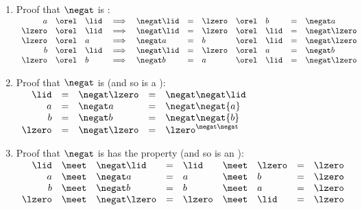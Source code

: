 \begin{proofns}
\begin{enumerate}
  \item Proof that $\negat$ is :
    $\begin{array}[t]{rcl c lcl c lclc}
      a      &\orel& \lid &\implies& \negat\lid &=& \lzero &\orel& b    &=&  \negat a     \\
      \lzero &\orel& \lid &\implies& \negat\lid &=& \lzero &\orel& \lid &=& \negat\lzero \\
      \lzero &\orel& a    &\implies&  \negat a   &=& b      &\orel& \lid &=& \negat\lzero \\
      b      &\orel& \lid &\implies& \negat\lid &=& \lzero &\orel& a    &=&  \negat b     \\
      \lzero &\orel& b    &\implies&  \negat b   &=& a      &\orel& \lid &=& \negat\lzero 
    \end{array}$

  \item Proof that $\negat$ is  (and so is a ):
    $\begin{array}[t]{rcl cl}
      \lid   &=& \negat\lzero &=& \negat\negat\lid   \\
      a      &=& \negat a      &=& \negat\negat{a}      \\
      b      &=& \negat b      &=& \negat\negat{b}      \\
      \lzero &=& \negat\lzero &=& \lzero^{\negat\negat} \\
    \end{array}$

  \item Proof that $\negat$ is has the  property (and so is an ):
    \\$\begin{array}[t]{rcl clclcl}
      \lid   &\meet& \negat\lid   &=& \lid   &\meet& \lzero &=& \lzero \\
      a      &\meet& \negat a      &=& a      &\meet& b      &=& \lzero \\
      b      &\meet& \negat b      &=& b      &\meet& a      &=& \lzero \\
      \lzero &\meet& \negat\lzero &=& \lzero &\meet& \lid   &=& \lzero 
    \end{array}$


\end{enumerate}
\end{proofns}
